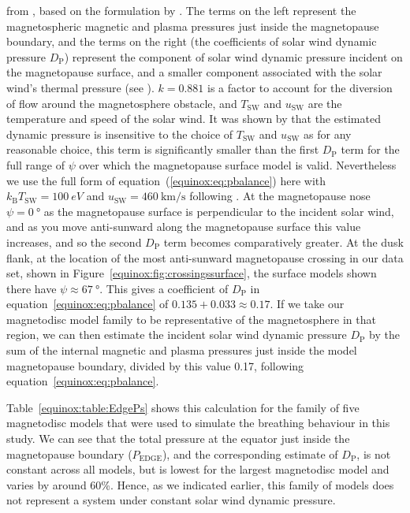 from \citet{kanani2010}, based on the formulation by \citet{petrinec1997}. The terms on the left represent the magnetospheric magnetic and plasma pressures just inside the magnetopause boundary, and the terms on the right (the coefficients of solar wind dynamic pressure $D_\mathrm{P}$) represent the component of solar wind dynamic pressure incident on the magnetopause surface, and a smaller component associated with the solar wind's thermal pressure (see \citet{kanani2010}). $k = 0.881$ is a factor to account for the diversion of flow around the magnetosphere obstacle, and $T_\mathrm{SW}$ and $u_\mathrm{SW}$ are the temperature and speed of the solar wind. It was shown by \citet{kanani2010} that the estimated dynamic pressure is insensitive to the choice of $T_\mathrm{SW}$ and $u_\mathrm{SW}$ as for any reasonable choice, this term is significantly smaller than the first $D_\mathrm{P}$ term for the full range of $\psi$ over which the magnetopause surface model is valid. Nevertheless we use the full form of equation~(\ref{equinox:eq:pbalance}) here with $k_\mathrm{B}T_\mathrm{SW} = \SI{100}{eV}$ and $u_\mathrm{SW} = \SI{460}{\km\per\second}$ following \citet{pilkington2015}. At the magnetopause nose $\psi = \SI{0}{\degree}$ as the magnetopause surface is perpendicular to the incident solar wind, and as you move anti-sunward along the magnetopause surface this value increases, and so the second $D_\mathrm{P}$ term becomes comparatively greater. At the dusk flank, at the location of the most anti-sunward magnetopause crossing in our data set, shown in Figure~\ref{equinox:fig:crossingssurface}, the \citet{pilkington2015} surface models shown there have $\psi \approx \SI{67}{\degree}$. This gives a coefficient of $D_\mathrm{P}$ in equation~\ref{equinox:eq:pbalance} of $0.135 + 0.033 \approx 0.17$. If we take our magnetodisc model family to be representative of the magnetosphere in that region, we can then estimate the incident solar wind dynamic pressure $D_\mathrm{P}$ by the sum of the internal magnetic and plasma pressures just inside the model magnetopause boundary, divided by this value 0.17, following equation~\ref{equinox:eq:pbalance}.

Table~\ref{equinox:table:EdgePs} shows this calculation for the family of five magnetodisc models that were used to simulate the breathing behaviour in this study. We can see that the total pressure at the equator just inside the magnetopause boundary ($P_\mathrm{EDGE}$), and the corresponding estimate of $D_\mathrm{P}$, is not constant across all models, but is lowest for the largest magnetodisc model and varies by around 60\%. Hence, as we indicated earlier, this family of models does not represent a system under constant solar wind dynamic pressure.

